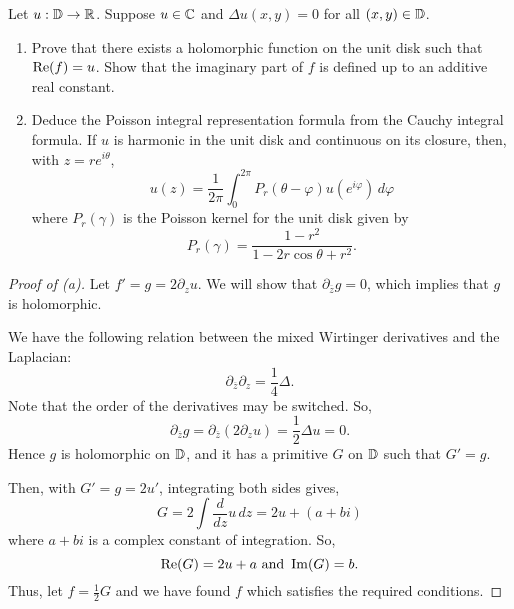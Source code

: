 \documentclass[../hw2]{subfiles}
\begin{document}
\begin{problem}
Let $u: \mathbb{D} \to \mathbb{R}$. Suppose $u\in \mathbb{C}$ and $\Delta u(x,y)=0$ for all $(x,y)\in \mathbb{D}$.
\begin{enumerate}[label=(\alph*)]
	\item Prove that there exists a holomorphic function on the unit disk such that $\operatorname{Re}(f)=u$.
	      Show that the imaginary part of $f$ is defined up to an additive real constant.
	\item Deduce the Poisson integral representation formula from the Cauchy integral formula.
	      If $u$ is harmonic in the unit disk and continuous on its closure, then, with $z=re^{i\theta}$, \[
		      u(z)=\frac{1}{2\pi}\int_{0}^{2\pi} P_r(\theta-\varphi)u(e^{i\varphi}) \,d\varphi
	      \] where $P_r(\gamma)$ is the Poisson kernel for the unit disk given by  \[
		      P_r(\gamma) = \frac{1-r^2}{1-2r\cos{\theta}+r^2}
		      .\]
\end{enumerate}
\end{problem}
\begin{proof}[Proof of (a)]
	Let $f'=g=2 \partial_z u$.
	We will show that $\partial_{\overline{z}} g = 0$, which implies that $g$ is holomorphic.

	We have the following relation between the mixed Wirtinger derivatives and the Laplacian: \[
		\partial_{\overline{z}}\partial_z = \frac{1}{4}\Delta
		.\]
	Note that the order of the derivatives may be switched.
	So, \[
		\partial_{\overline{z}} g = \partial_{\overline{z}}(2 \partial_z u) =  \frac{1}{2}\Delta u = 0
		.\]
	Hence $g$ is holomorphic on $\mathbb{D}$, and it has a primitive $G$ on  $\mathbb{D}$ such that $G' = g$.

	Then, with $G' = g = 2u'$, integrating both sides gives, \[
		G = 2 \int \frac{d}{dz} u \,dz = 2u + (a+bi)
	\] where $a+bi$ is a complex constant of integration.
	So, \[
		\operatorname{Re}(G)=2u+a \text{ and } \operatorname{Im}(G) = b
		.\]
	Thus, let $f=\frac{1}{2}G$ and we have found $f$ which satisfies the required conditions.
\end{proof}
\end{document}
